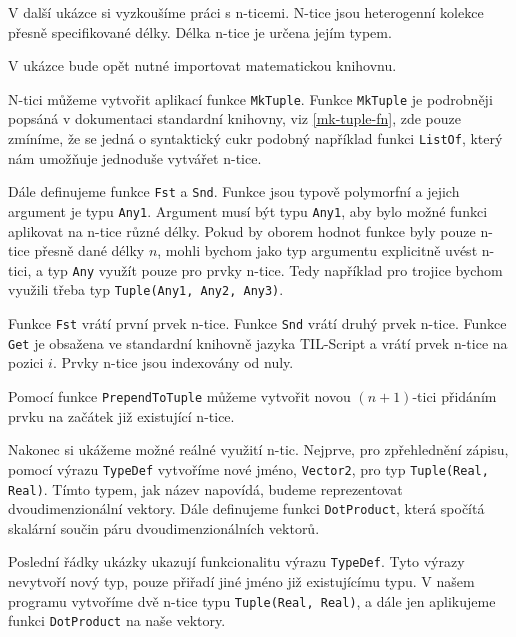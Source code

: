V další ukázce si vyzkoušíme práci s n-ticemi. N-tice jsou heterogenní kolekce přesně specifikované
délky. Délka n-tice je určena jejím typem.

V ukázce bude opět nutné importovat matematickou knihovnu.

N-tici můžeme vytvořit aplikací funkce \lstinline{MkTuple}. Funkce \lstinline{MkTuple} je podrobněji
popsáná v dokumentaci standardní knihovny, viz \ref{mk-tuple-fn}, zde pouze zmíníme, že se
jedná o syntaktický cukr podobný například funkci \lstinline{ListOf}, který nám umožňuje jednoduše
vytvářet n-tice.

Dále definujeme funkce \lstinline{Fst} a \lstinline{Snd}. Funkce jsou typově polymorfní a jejich
argument je typu \lstinline{Any1}. Argument musí být typu \lstinline{Any1}, aby bylo možné funkci
aplikovat na n-tice různé délky. Pokud by oborem hodnot funkce byly pouze n-tice přesně dané délky
$n$, mohli bychom jako typ argumentu explicitně uvést n-tici, a typ \lstinline{Any} využít pouze
pro prvky n-tice. Tedy například pro trojice bychom využili třeba typ
\lstinline{Tuple(Any1, Any2, Any3)}.

Funkce \lstinline{Fst} vrátí první prvek n-tice. Funkce \lstinline{Snd} vrátí druhý prvek n-tice.
Funkce \lstinline{Get} je obsažena ve standardní knihovně jazyka TIL-Script a vrátí prvek n-tice
na pozici $i$. Prvky n-tice jsou indexovány od nuly.

Pomocí funkce \lstinline{PrependToTuple} můžeme vytvořit novou $(n+1)$-tici přidáním prvku
na začátek již existující n-tice.

Nakonec si ukážeme možné reálné využití n-tic. Nejprve, pro zpřehlednění zápisu, pomocí výrazu
\lstinline{TypeDef} vytvoříme nové jméno, \lstinline{Vector2}, pro typ
\lstinline{Tuple(Real, Real)}. Tímto typem, jak název napovídá, budeme reprezentovat
dvoudimenzionální vektory. Dále definujeme funkci \lstinline{DotProduct}, která spočítá skalární
součin páru dvoudimenzionálních vektorů.

Poslední řádky ukázky ukazují funkcionalitu výrazu \lstinline{TypeDef}. Tyto výrazy nevytvoří nový
typ, pouze přiřadí jiné jméno již existujícímu typu. V našem programu vytvoříme dvě n-tice typu
\lstinline{Tuple(Real, Real)}, a dále jen aplikujeme funkci \lstinline{DotProduct} na naše vektory.

